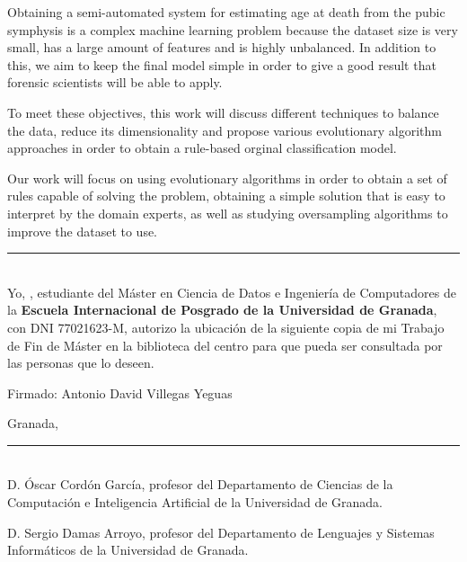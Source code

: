 Obtaining a semi-automated system for estimating age at death from the pubic symphysis is a complex machine learning problem because the dataset size is very small, has a large amount of features and is highly unbalanced. In addition to this, we aim to keep the final model simple in order to give a good result that forensic scientists will be able to apply.


To meet these objectives, this work will discuss different techniques to balance the data, reduce its dimensionality and propose various evolutionary algorithm approaches in order to obtain a rule-based orginal classification model.


Our work will focus on using evolutionary algorithms in order to obtain a set of rules capable of solving the problem, obtaining a simple solution that is easy to interpret by the domain experts, as well as studying oversampling algorithms to improve the dataset to use.



\newpage

\vspace*{2cm}

\rule{\linewidth}{1 mm} \\[1 cm]

{\large Yo, \textbf{\theauthor}, estudiante del Máster en Ciencia de Datos e Ingeniería de Computadores de la \textbf{Escuela Internacional de Posgrado de la Universidad de Granada}, con DNI 77021623-M, autorizo la ubicación de la siguiente copia de mi Trabajo de Fin de Máster en la biblioteca del centro para que pueda ser consultada por las personas que lo deseen.}

\vspace{7cm}

Firmado: Antonio David Villegas Yeguas

\vspace{2cm}

Granada, \thedate



\newpage

\vspace*{2cm}

\rule{\linewidth}{1 mm} \\[1 cm]

D. Óscar Cordón García, profesor del Departamento de Ciencias de la Computación e Inteligencia Artificial de la Universidad de Granada.

\vspace{1cm}

D. Sergio Damas Arroyo, profesor del Departamento de Lenguajes y Sistemas Informáticos de la Universidad de Granada.

